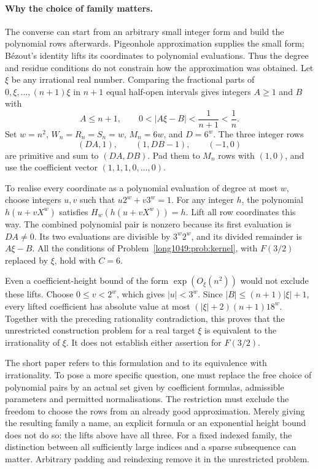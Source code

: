 \documentclass[11pt]{article}
\begin{document}
\paragraph{Why the choice of family matters.}
The converse can start from an arbitrary small integer form and
build the polynomial rows afterwards. Pigeonhole approximation
supplies the small form; B\'ezout's identity lifts its coordinates
to polynomial evaluations. Thus the degree and residue conditions
do not constrain how the approximation was obtained. Let $\xi$ be
any irrational real number. Comparing the fractional parts
of $0,\xi,\ldots,(n+1)\xi$ in $n+1$ equal half-open intervals gives
integers $A\ge1$ and $B$ with
\[
 A\le n+1,\qquad 0<|A\xi-B|<\frac1{n+1}<\frac1n.
\]
Set $w=n^2$, $W_n=R_n=S_n=w$, $M_n=6w$, and $D=6^w$.
The three integer rows
\[
 (DA,1),\qquad (1,DB-1),\qquad (-1,0)
\]
are primitive and sum to $(DA,DB)$. Pad them to $M_n$ rows with
$(1,0)$, and use the coefficient vector $(1,1,1,0,\ldots,0)$.

To realise every coordinate as a polynomial evaluation of degree at
most $w$, choose integers $u,v$ such that $u2^w+v3^w=1$. For any
integer $h$, the polynomial $h(u+vX^w)$ satisfies
$H_w(h(u+vX^w))=h$. Lift all row coordinates this way.
The combined polynomial pair is nonzero because its first evaluation
is $DA\ne0$. Its two evaluations are divisible by $3^w2^w$, and its
divided remainder is $A\xi-B$. All the conditions of
Problem~\ref{long1049:prob:kernel}, with $F(3/2)$ replaced by $\xi$,
hold with $C=6$.

Even a coefficient-height bound of the form $\exp(O_\xi(n^2))$ would
not exclude these lifts. Choose $0\le v<2^w$, which gives $|u|<3^w$.
Since $|B|\le(n+1)|\xi|+1$, every lifted coefficient has absolute value
at most $(|\xi|+2)(n+1)18^w$.
Together with the preceding rationality contradiction, this proves that
the unrestricted construction problem for a real target $\xi$ is
equivalent to the irrationality of $\xi$. It does not establish either
assertion for $F(3/2)$.

The short paper refers to this formulation and to its equivalence with
irrationality.
To pose a more specific question, one must replace the free choice of
polynomial pairs by an actual set given by coefficient formulas,
admissible parameters and permitted normalisations. The restriction must exclude the freedom to choose the rows from
an already good approximation. Merely giving the resulting family
a name, an explicit formula or an exponential height bound does
not do so: the lifts above have all three. For a fixed indexed family, the distinction between all
sufficiently large indices and a sparse subsequence can matter.
Arbitrary padding and reindexing remove it in the unrestricted problem.
\end{document}
